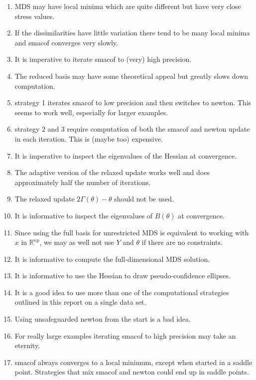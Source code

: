\documentclass[
  12pt,
]{article}
\providecommand{\tightlist}{%
  \setlength{\itemsep}{0pt}\setlength{\parskip}{0pt}}
\begin{document}
\begin{enumerate}
\def\labelenumi{\arabic{enumi}.}
\tightlist
\item
  MDS may have local minima which are quite different but have very close stress values.
\item
  If the dissimilarities have little variation there tend to be many local minima and
  smacof converges very slowly.
\item
  It is imperative to iterate smacof to (very) high precision.
\item
  The reduced basis may have some theoretical appeal but greatly slows down computation.
\item
  strategy 1 iterates smacof to low precision and then switches to newton. This seems to work
  well, especially for larger examples.
\item
  strategy 2 and 3 require computation of both the smacof and newton update in each iteration.
  This is (maybe too) expensive.
\item
  It is imperative to inspect the eigenvalues of the Hessian at convergence.
\item
  The adaptive version of the relaxed update works well and does approximately
  half the number of iterations.
\item
  The relaxed update \(2\Gamma(\theta)-\theta\) should not be used.
\item
  It is informative to inspect the eigenvalues of \(B(\theta)\) at convergence.
\item
  Since using the full basis for unrestricted MDS is equivalent to
  working with \(x\) in \(\mathbb{R}^{np}\), we may as well not use \(Y\) and \(\theta\)
  if there are no constraints.
\item
  It is informative to compute the full-dimensional MDS solution.
\item
  It is informative to use the Hessian to draw pseudo-confidence ellipses.
\item
  It is a good idea to use more than one of the computational strategies
  outlined in this report on a single data set.
\item
  Using unsafeguarded newton from the start is a bad idea.
\item
  For really large examples iterating smacof to high precision may take
  an eternity.
\item
  smacof always converges to a local minimum, except when started in a
  saddle point. Strategies that mix smacof and newton could end up in
  saddle points.
\end{enumerate}
\end{document}
